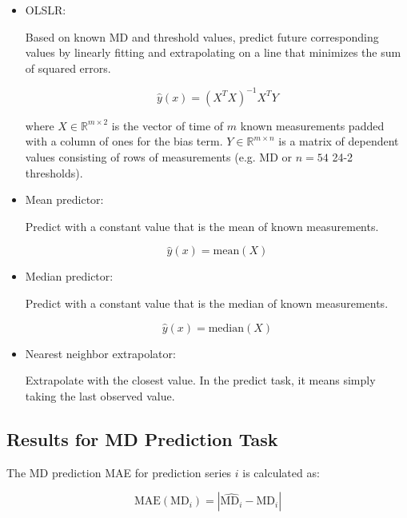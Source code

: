 \begin{itemize}
	\item \acf{OLSLR}: 
	
	Based on known \ac{MD} and threshold values, predict future corresponding values by linearly fitting and extrapolating on a line that minimizes the sum of squared errors. 
	
	\begin{equation}
		\hat{y}(x)=(X^TX)^{-1}X^TY
	\end{equation}
	
	where $X\in\mathbb{R}^{m\times 2}$ is the vector of time of $m$ known measurements padded with a column of ones for the bias term. $Y\in\mathbb{R}^{m\times n}$ is a matrix of dependent values consisting of rows of measurements (e.g. \ac{MD} or $n=54$ 24-2 thresholds).
	
	\item Mean predictor:
	
	Predict with a constant value that is the mean of known measurements.
	
	\begin{equation}
		\hat{y}(x)=\textrm{mean}(X)
	\end{equation}
	
	\item Median predictor:
	
	Predict with a constant value that is the median of known measurements.
	
	\begin{equation}
	\hat{y}(x)=\textrm{median}(X)
	\end{equation}
	
	\item Nearest neighbor extrapolator:
	
	Extrapolate with the closest value. In the predict task, it means simply taking the last observed value.
	
\end{itemize}

\subsection{Results for MD Prediction Task}

The \ac{MD} prediction \ac{MAE} for prediction series $i$ is calculated as:

\begin{equation}
\textrm{MAE}({\textrm{MD}_i}) = \left|\widehat{\textrm{MD}_i}-\textrm{MD}_i \right|
\end{equation}

